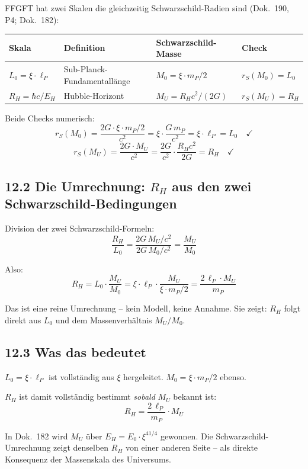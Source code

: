 FFGFT hat zwei Skalen die gleichzeitig Schwarzschild-Radien sind
(Dok.~190, P4; Dok.~182):

\begin{center}
\begin{tabular}{p{2.5cm}p{4cm}p{4cm}l}
\toprule
\textbf{Skala} & \textbf{Definition} & \textbf{Schwarzschild-Masse} & \textbf{Check} \\
\midrule
$L_0 = \xi\cdot\ell_P$ &
  Sub-Planck-Fundamentallänge &
  $M_0 = \xi\cdot m_P/2$ &
  $r_S(M_0) = L_0$ \\
\addlinespace
$R_H = \hbar c/E_H$ &
  Hubble-Horizont &
  $M_U = R_H c^2/(2G)$ &
  $r_S(M_U) = R_H$ \\
\bottomrule
\end{tabular}
\end{center}

Beide Checks numerisch:
\[
  r_S(M_0) = \frac{2G\cdot\xi\cdot m_P/2}{c^2}
  = \xi\cdot\frac{G\,m_P}{c^2}
  = \xi\cdot\ell_P = L_0
  \quad\checkmark
\]
\[
  r_S(M_U) = \frac{2G\cdot M_U}{c^2}
  = \frac{2G}{c^2}\cdot\frac{R_H c^2}{2G}
  = R_H
  \quad\checkmark
\]

\subsection*{12.2 Die Umrechnung: $R_H$ aus den zwei Schwarzschild-Bedingungen}

Division der zwei Schwarzschild-Formeln:
\[
  \frac{R_H}{L_0}
  = \frac{2G\,M_U/c^2}{2G\,M_0/c^2}
  = \frac{M_U}{M_0}
\]

Also:
\[
  \boxed{R_H = L_0 \cdot \frac{M_U}{M_0}
  = \xi\cdot\ell_P\cdot\frac{M_U}{\xi\cdot m_P/2}
  = \frac{2\,\ell_P\cdot M_U}{m_P}}
\]

Das ist eine reine Umrechnung -- kein Modell, keine Annahme.
Sie zeigt: $R_H$ folgt direkt aus $L_0$ und dem Massenverhältnis
$M_U/M_0$.

\subsection*{12.3 Was das bedeutet}

$L_0 = \xi\cdot\ell_P$ ist vollständig aus $\xi$ hergeleitet.
$M_0 = \xi\cdot m_P/2$ ebenso.

$R_H$ ist damit vollständig bestimmt \emph{sobald} $M_U$ bekannt ist:
\[
  R_H = \frac{2\,\ell_P}{m_P}\cdot M_U
\]

In Dok.~182 wird $M_U$ über $E_H = E_0\cdot\xi^{41/4}$ gewonnen.
Die Schwarzschild-Umrechnung zeigt denselben $R_H$ von einer anderen
Seite -- als direkte Konsequenz der Massenskala des Universums.

